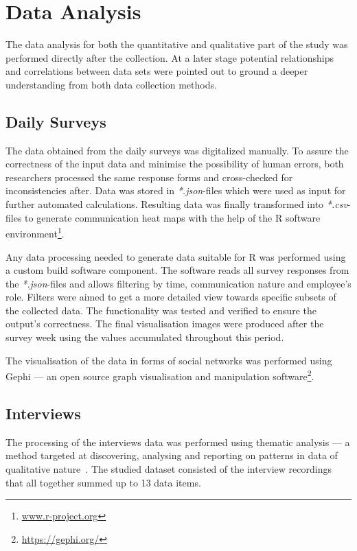 \section{Data Analysis}

The data analysis for both the quantitative and qualitative part of the study was performed directly after the collection. At a later stage potential relationships and correlations between data sets were pointed out to ground a deeper understanding from both data collection methods. 

\subsection{Daily Surveys}
 
The data obtained from the daily surveys was digitalized manually. To assure the correctness of the input data and minimise the possibility of human errors, both researchers processed the same response forms and cross-checked for inconsistencies after.
Data was stored in \emph{*.json}-files which were used as input for further automated calculations. Resulting data was finally transformed into \emph{*.csv}-files to generate communication heat maps with the help of the R software environment\footnote{\url{www.r-project.org}}.

Any data processing needed to generate data suitable for R was performed using a custom build software component. The software reads all survey responses from the \emph{*.json}-files and allows filtering by time, communication nature and employee's role. Filters were aimed to get a more detailed view towards specific subsets of the collected data. The functionality was tested and verified to ensure the output's correctness.
The final visualisation images were produced after the survey week using the values accumulated throughout this period.

The visualisation of the data in forms of social networks was performed using Gephi — an open source graph visualisation and manipulation software\footnote{\url{https://gephi.org/}}.

\subsection{Interviews}

The processing of the interviews data was performed using thematic analysis — a method targeted at discovering, analysing and reporting on patterns in data of qualitative nature~\citep{braun2006using}. The studied dataset consisted of the interview recordings that all together summed up to 13 data items.

